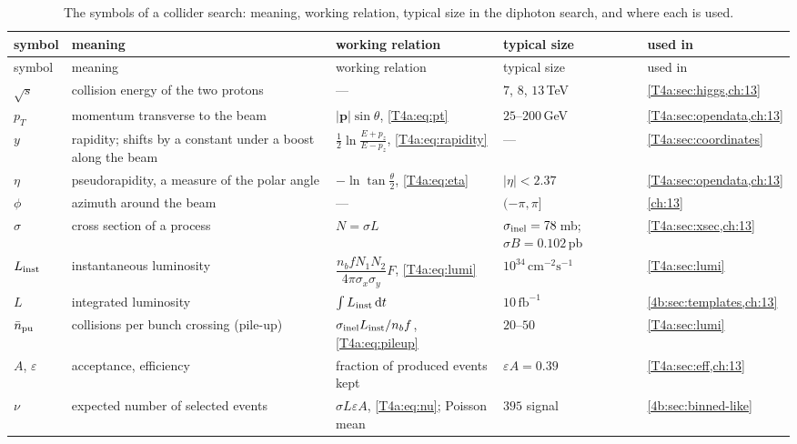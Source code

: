 \begin{small}
\setlength{\tabcolsep}{4pt}
\begin{xltabular}{\linewidth}{>{\raggedright\arraybackslash}p{1.5cm} >{\raggedright\arraybackslash}X >{\raggedright\arraybackslash}p{3.6cm} >{\raggedright\arraybackslash}p{2.6cm} >{\raggedright\arraybackslash}p{2.0cm}}
\caption{The symbols of a collider search: meaning, working relation, typical size in the diphoton search, and where each is used.}
\label{T4a:tab:symbols}\\
\toprule
symbol & meaning & working relation & typical size & used in \\
\midrule
\endfirsthead
\toprule
symbol & meaning & working relation & typical size & used in \\
\midrule
\endhead
\bottomrule
\endfoot
$\sqrt s$ & collision energy of the two protons & --- & $7$, $8$, $13$\,TeV & \cref{T4a:sec:higgs,ch:13} \\
$p_T$ & momentum transverse to the beam & $\lvert\bm p\rvert\sin\theta$, \eqref{T4a:eq:pt} & $25$--$200$\,GeV & \cref{T4a:sec:opendata,ch:13} \\
$y$ & rapidity; shifts by a constant under a boost along the beam & $\frac12\ln\frac{E+p_z}{E-p_z}$, \eqref{T4a:eq:rapidity} & --- & \cref{T4a:sec:coordinates} \\
$\eta$ & pseudorapidity, a measure of the polar angle & $-\ln\tan\frac\theta2$, \eqref{T4a:eq:eta} & $\lvert\eta\rvert<2.37$ & \cref{T4a:sec:opendata,ch:13} \\
$\phi$ & azimuth around the beam & --- & $(-\pi,\pi]$ & \cref{ch:13} \\
$\sigma$ & cross section of a process & $N=\sigma L$ & $\sigma_{\rm inel}=78$\,mb; $\sigma B=0.102$\,pb & \cref{T4a:sec:xsec,ch:13} \\
$L_{\rm inst}$ & instantaneous luminosity & $\dfrac{n_bfN_1N_2}{4\pi\sigma_x\sigma_y}F$, \eqref{T4a:eq:lumi} & $10^{34}\,\mathrm{cm^{-2}s^{-1}}$ & \cref{T4a:sec:lumi} \\
$L$ & integrated luminosity & $\int L_{\rm inst}\,\mathrm{d} t$ & $10\,\mathrm{fb^{-1}}$ & \cref{4b:sec:templates,ch:13} \\
$\bar n_{\rm pu}$ & collisions per bunch crossing (pile-up) & $\sigma_{\rm inel}L_{\rm inst}/n_bf$, \eqref{T4a:eq:pileup} & $20$--$50$ & \cref{T4a:sec:lumi} \\
$A$, $\varepsilon$ & acceptance, efficiency & fraction of produced events kept & $\varepsilon A=0.39$ & \cref{T4a:sec:eff,ch:13} \\
$\nu$ & expected number of selected events & $\sigma L\varepsilon A$, \eqref{T4a:eq:nu}; Poisson mean & $395$ signal & \cref{4b:sec:binned-like} \\

\end{xltabular}
\end{small}
